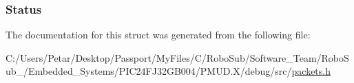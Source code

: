\subsubsection[{Status}]{ Status}\label{struct_packet_dirty_power_get_struct_adf6a0247651b754ec4d7d4982c2914e5}


The documentation for this struct was generated from the following file\+:\begin{DoxyCompactItemize}
\item 
C\+:/\+Users/\+Petar/\+Desktop/\+Passport/\+My\+Files/\+C/\+Robo\+Sub/\+Software\+\_\+\+Team/\+Robo\+Sub\+\_/\+Embedded\+\_\+\+Systems/\+P\+I\+C24\+F\+J32\+G\+B004/\+P\+M\+U\+D.\+X/debug/src/\hyperlink{_p_m_u_d_8_x_2debug_2src_2packets_8h}{packets.\+h}\end{DoxyCompactItemize}
